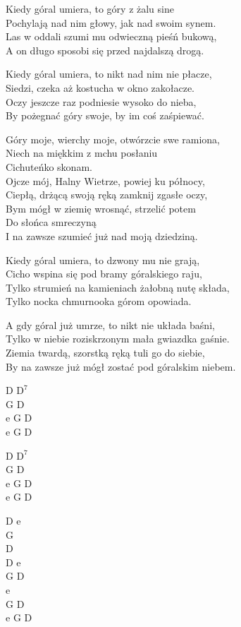 \begin{text}
    \begin{smallTwo}
        Kiedy góral umiera, to góry z żalu sine\\
        Pochylają nad nim głowy, jak nad swoim synem.\\
        Las w oddali szumi mu odwieczną pieśń bukową,\\
        A on długo sposobi się przed najdalszą drogą.

        Kiedy góral umiera, to nikt nad nim nie płacze,\\
        Siedzi, czeka aż kostucha w okno zakołacze.\\
        Oczy jeszcze raz podniesie wysoko do nieba,\\
        By pożegnać góry swoje, by im coś zaśpiewać.

        \vin Góry moje, wierchy moje, otwórzcie swe ramiona,\\
        \vin Niech na miękkim z mchu posłaniu\\
        \vin Cichuteńko skonam.\\
        \vin Ojcze mój, Halny Wietrze, powiej ku północy,\\
        \vin Ciepłą, drżącą swoją ręką zamknij zgasłe oczy,\\
        \vin Bym mógł w ziemię wrosnąć, strzelić potem\\
        \vin Do słońca smreczyną\\
        \vin I na zawsze szumieć już nad moją dziedziną.

        Kiedy góral umiera, to dzwony mu nie grają,\\
        Cicho wspina się pod bramy góralskiego raju,\\
        Tylko strumień na kamieniach żałobną nutę składa,\\
        Tylko nocka chmurnooka górom opowiada.

        A gdy góral już umrze, to nikt nie układa baśni,\\
        Tylko w niebie roziskrzonym mała gwiazdka gaśnie.\\
        Ziemia twardą, szorstką ręką tuli go do siebie,\\
        By na zawsze już mógł zostać pod góralskim niebem.
\end{smallTwo}
\end{text}
\begin{chord}
    \begin{smallTwo}
    D $\mathrm{D^{7}}$\\
    G D\\
    e G D\\
    e G D

    D $\mathrm{D^{7}}$\\
    G D\\
    e G D\\
    e G D

    D e\\
    G\\
    D\\
    D e\\
    G D\\
    e\\
    G D\\
    e G D
\end{smallTwo}
\end{chord}

